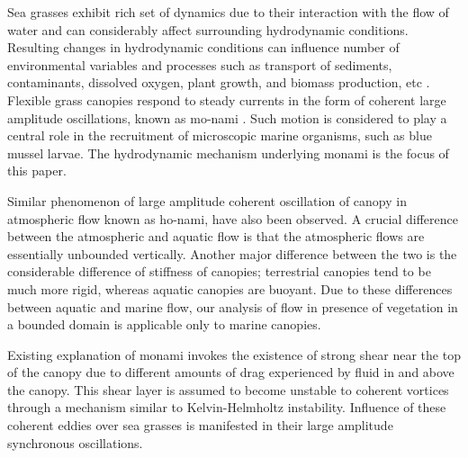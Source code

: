 \documentclass[aps,prl,reprint,twocolumn,showpacs,superscriptaddress,10pt]{revtex4-1}  %
\begin{document}
Sea grasses exhibit rich set of dynamics due to their interaction with the flow of water and can considerably affect surrounding hydrodynamic conditions.
Resulting changes in hydrodynamic conditions can influence number of environmental variables and processes such as transport of sediments, contaminants, dissolved oxygen, plant growth, and biomass production, etc \cite{Fonseca87,Nepf99,Nepf2012}. 
Flexible grass canopies respond to steady currents in the form of coherent large amplitude oscillations, known as mo-nami \cite{AckermanOkubo93}. Such motion is considered to play a central role in the recruitment of microscopic marine organisms, such as blue mussel larvae\cite{Grizzle96}.
The hydrodynamic mechanism underlying monami is the focus of this paper. 

Similar phenomenon of large amplitude coherent oscillation of canopy in atmospheric flow known as ho-nami\cite{Inoue56,Raupach96}, have also been observed.
A crucial difference between the atmospheric and aquatic flow is that the atmospheric flows are essentially unbounded vertically\cite{Vivoni98,Nepf00}. 
Another major difference between the two is the considerable difference of stiffness of canopies; terrestrial canopies tend to be much more rigid, whereas aquatic canopies are buoyant\cite{Vivoni98,Ghisal02}.
Due to these differences between aquatic and marine flow, our analysis of flow in presence of vegetation in a bounded domain is applicable only to marine canopies. 

Existing explanation of monami invokes the existence of strong shear near the top of the canopy \cite{Ghisal02,Raupach96} due to different amounts of drag experienced by fluid in and above the canopy. 
This shear layer is assumed to become unstable to coherent vortices through a mechanism similar to Kelvin-Helmholtz instability. 
Influence of these coherent eddies over sea grasses is manifested in their large amplitude synchronous oscillations.
\end{document}
